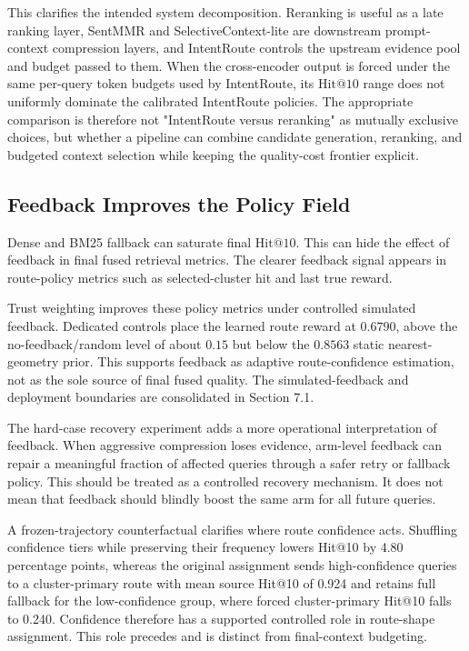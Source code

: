This clarifies the intended system decomposition. Reranking is useful as a late ranking layer, SentMMR and SelectiveContext-lite are downstream prompt-context compression layers, and IntentRoute controls the upstream evidence pool and budget passed to them. When the cross-encoder output is forced under the same per-query token budgets used by IntentRoute, its $\mathrm{Hit@10}$ range does not uniformly dominate the calibrated IntentRoute policies. The appropriate comparison is therefore not "IntentRoute versus reranking" as mutually exclusive choices, but whether a pipeline can combine candidate generation, reranking, and budgeted context selection while keeping the quality-cost frontier explicit.

\subsection{Feedback Improves the Policy Field}
\label{sec:07-discussion:feedback-improves-the-policy-field}

Dense and BM25 fallback can saturate final $\mathrm{Hit@10}$. This can hide the effect of feedback in final fused retrieval metrics. The clearer feedback signal appears in route-policy metrics such as selected-cluster hit and last true reward.

Trust weighting improves these policy metrics under controlled simulated feedback. Dedicated controls place the learned route reward at $0.6790$, above the no-feedback/random level of about $0.15$ but below the $0.8563$ static nearest-geometry prior. This supports feedback as adaptive route-confidence estimation, not as the sole source of final fused quality. The simulated-feedback and deployment boundaries are consolidated in Section 7.1.

The hard-case recovery experiment adds a more operational interpretation of feedback. When aggressive compression loses evidence, arm-level feedback can repair a meaningful fraction of affected queries through a safer retry or fallback policy. This should be treated as a controlled recovery mechanism. It does not mean that feedback should blindly boost the same arm for all future queries.

A frozen-trajectory counterfactual clarifies where route confidence acts. Shuffling confidence tiers while preserving their frequency lowers Hit@10 by 4.80 percentage points, whereas the original assignment sends high-confidence queries to a cluster-primary route with mean source Hit@10 of 0.924 and retains full fallback for the low-confidence group, where forced cluster-primary Hit@10 falls to 0.240. Confidence therefore has a supported controlled role in route-shape assignment. This role precedes and is distinct from final-context budgeting.

